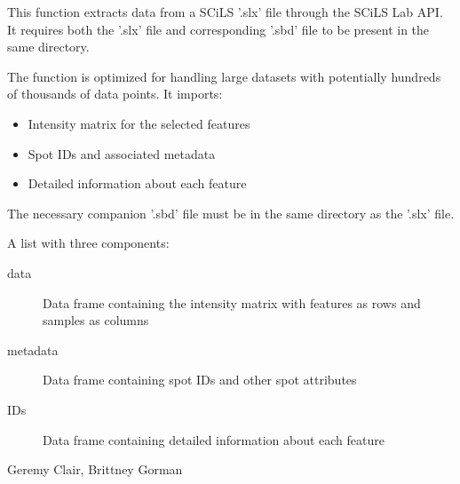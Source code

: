 \documentclass[a4paper]{book}
\begin{document}
%
\begin{Details}
This function extracts data from a SCiLS '.slx' file through the SCiLS Lab API.
It requires both the '.slx' file and corresponding '.sbd' file to be present in the same directory.

The function is optimized for handling large datasets with potentially hundreds of thousands of
data points. It imports:
\begin{itemize}

\item{} Intensity matrix for the selected features
\item{} Spot IDs and associated metadata
\item{} Detailed information about each feature

\end{itemize}


The necessary companion '.sbd' file must be in the same directory as the '.slx' file.
\end{Details}
%
\begin{Value}
A list with three components:
\begin{description}

\item[data] Data frame containing the intensity matrix with features as rows and samples as columns
\item[metadata] Data frame containing spot IDs and other spot attributes
\item[IDs] Data frame containing detailed information about each feature

\end{description}

\end{Value}
%
\begin{Author}
Geremy Clair, Brittney Gorman
\end{Author}
%
\begin{Examples}
\end{Examples}
\end{document}
